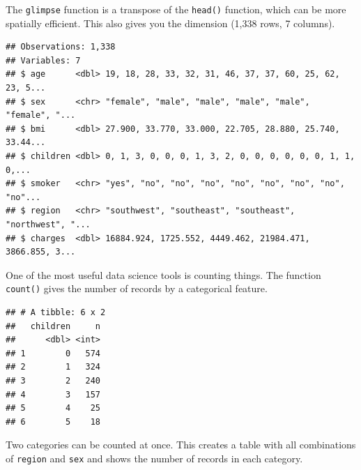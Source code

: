 \documentclass[openany]{book}
\newenvironment{Shaded}{\begin{snugshade}}{\end{snugshade}}
\newcommand{\KeywordTok}[1]{\textcolor[rgb]{0.13,0.29,0.53}{\textbf{#1}}}
\newcommand{\NormalTok}[1]{#1}
\newcommand{\OperatorTok}[1]{\textcolor[rgb]{0.81,0.36,0.00}{\textbf{#1}}}
\newcommand{\StringTok}[1]{\textcolor[rgb]{0.31,0.60,0.02}{#1}}
\begin{document}
The \texttt{glimpse} function is a transpose of the \texttt{head()} function, which can be more spatially efficient. This also gives you the dimension (1,338 rows, 7 columns).

\begin{Shaded}
\end{Shaded}

\begin{verbatim}
## Observations: 1,338
## Variables: 7
## $ age      <dbl> 19, 18, 28, 33, 32, 31, 46, 37, 37, 60, 25, 62, 23, 5...
## $ sex      <chr> "female", "male", "male", "male", "male", "female", "...
## $ bmi      <dbl> 27.900, 33.770, 33.000, 22.705, 28.880, 25.740, 33.44...
## $ children <dbl> 0, 1, 3, 0, 0, 0, 1, 3, 2, 0, 0, 0, 0, 0, 0, 1, 1, 0,...
## $ smoker   <chr> "yes", "no", "no", "no", "no", "no", "no", "no", "no"...
## $ region   <chr> "southwest", "southeast", "southeast", "northwest", "...
## $ charges  <dbl> 16884.924, 1725.552, 4449.462, 21984.471, 3866.855, 3...
\end{verbatim}

One of the most useful data science tools is counting things. The function \texttt{count()} gives the number of records by a categorical feature.

\begin{Shaded}
\end{Shaded}

\begin{verbatim}
## # A tibble: 6 x 2
##   children     n
##      <dbl> <int>
## 1        0   574
## 2        1   324
## 3        2   240
## 4        3   157
## 5        4    25
## 6        5    18
\end{verbatim}

Two categories can be counted at once. This creates a table with all combinations of \texttt{region} and \texttt{sex} and shows the number of records in each category.

\begin{Shaded}
\end{Shaded}
\end{document}
